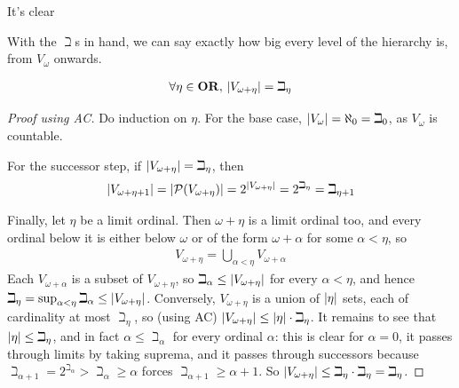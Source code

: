 It's clear \sorry

With the $\beth$s in hand, we can say exactly how big every level of the hierarchy is, from $V_{\omega}$ onwards.

\begin{boxproposition}
    \begin{align*}
        \forall \eta \in \mathbf{OR}, \, \left\lvert V_{\omega + \eta} \right\rvert = \beth_{\eta}
    \end{align*}
\end{boxproposition}
\begin{proof}[Proof using AC]
    Do induction on $\eta$. For the base case, $\left\lvert V_{\omega} \right\rvert = \aleph_0 = \beth_0$, as $V_{\omega}$ is countable.

    For the successor step, if $\left\lvert V_{\omega + \eta} \right\rvert = \beth_{\eta}$, then
    \begin{align*}
        \left\lvert V_{\omega + \eta + 1} \right\rvert = \left\lvert \mathcal{P}\!\left( V_{\omega + \eta} \right) \right\rvert = 2^{\left\lvert V_{\omega + \eta} \right\rvert} = 2^{\beth_{\eta}} = \beth_{\eta + 1}
    \end{align*}

    Finally, let $\eta$ be a limit ordinal. Then $\omega + \eta$ is a limit ordinal too, and every ordinal below it is either below $\omega$ or of the form $\omega + \alpha$ for some $\alpha < \eta$, so
    \begin{align*}
        V_{\omega + \eta} = \bigcup_{\alpha < \eta} V_{\omega + \alpha}
    \end{align*}
    Each $V_{\omega + \alpha}$ is a subset of $V_{\omega + \eta}$, so $\beth_{\alpha} \leq \left\lvert V_{\omega + \eta} \right\rvert$ for every $\alpha < \eta$, and hence $\beth_{\eta} = \sup_{\alpha < \eta} \beth_{\alpha} \leq \left\lvert V_{\omega + \eta} \right\rvert$. Conversely, $V_{\omega + \eta}$ is a union of $\left\lvert \eta \right\rvert$ sets, each of cardinality at most $\beth_{\eta}$, so (using AC) $\left\lvert V_{\omega + \eta} \right\rvert \leq \left\lvert \eta \right\rvert \cdot \beth_{\eta}$. It remains to see that $\left\lvert \eta \right\rvert \leq \beth_{\eta}$, and in fact $\alpha \leq \beth_{\alpha}$ for every ordinal $\alpha$: this is clear for $\alpha = 0$, it passes through limits by taking suprema, and it passes through successors because $\beth_{\alpha + 1} = 2^{\beth_{\alpha}} > \beth_{\alpha} \geq \alpha$ forces $\beth_{\alpha + 1} \geq \alpha + 1$. So $\left\lvert V_{\omega + \eta} \right\rvert \leq \beth_{\eta} \cdot \beth_{\eta} = \beth_{\eta}$.
\end{proof}

